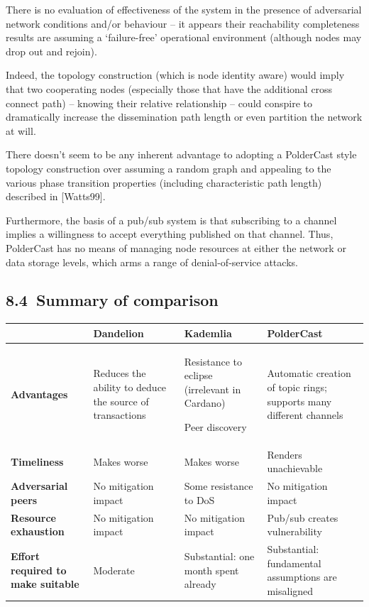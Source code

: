 \documentclass[11pt,a4paper]{article}
\begin{document}
There is no evaluation of effectiveness of the system in the presence of
adversarial network conditions and/or behaviour -- it appears their
reachability completeness results are assuming a `failure-free'
operational environment (although nodes may drop out and rejoin).

Indeed, the topology construction (which is node identity aware) would
imply that two cooperating nodes (especially those that have the
additional cross connect path) -- knowing their relative relationship --
could conspire to dramatically increase the dissemination path length or
even partition the network at will.

There doesn't seem to be any inherent advantage to adopting a PolderCast
style topology construction over assuming a random graph and appealing
to the various phase transition properties (including characteristic
path length) described in {[}Watts99{]}.

Furthermore, the basis of a pub/sub system is that subscribing to a
channel implies a willingness to accept everything published on that
channel. Thus, PolderCast has no means of managing node resources at
either the network or data storage levels, which arms a range of
denial-of-service attacks.

\hypertarget{summary-of-comparison}{%
\subsection{​8.4​~Summary of comparison}\label{summary-of-comparison}}

\begin{longtable}[]{@{}llll@{}}
\toprule
& \textbf{Dandelion} & \textbf{Kademlia} &
\textbf{PolderCast}\tabularnewline
\midrule
\endhead
\begin{minipage}[t]{0.22\columnwidth}\raggedright
\textbf{Advantages}\strut
\end{minipage} & \begin{minipage}[t]{0.22\columnwidth}\raggedright
Reduces the ability to deduce the source of transactions\strut
\end{minipage} & \begin{minipage}[t]{0.22\columnwidth}\raggedright
Resistance to eclipse (irrelevant in Cardano)

Peer discovery\strut
\end{minipage} & \begin{minipage}[t]{0.22\columnwidth}\raggedright
Automatic creation of topic rings; supports many different
channels\strut
\end{minipage}\tabularnewline
\textbf{Timeliness} & Makes worse & Makes worse & Renders
unachievable\tabularnewline
\textbf{Adversarial peers} & No mitigation impact & Some resistance to
DoS & No mitigation impact\tabularnewline
\textbf{Resource exhaustion} & No mitigation impact & No mitigation
impact & Pub/sub creates vulnerability\tabularnewline
\textbf{Effort required to make suitable} & Moderate & Substantial: one
month spent already & Substantial: fundamental assumptions are
misaligned\tabularnewline
\bottomrule
\end{longtable}
\end{document}
